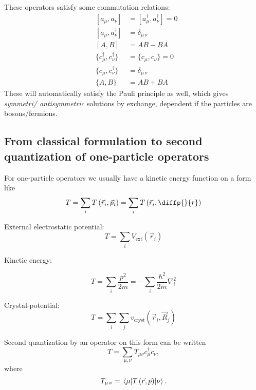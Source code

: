 These operators satisfy some commutation relations:
\begin{align}
&[a_\mu, a_{\nu}] & = [a_\mu^\dagger, a_{\nu}^\dagger] = 0 \\
&[a_\mu, a_{\nu}^\dagger] & = \delta_{\mu\,\nu} \\
&[A,B] &= AB-BA \\
&\{c_\mu^\dagger, c_{\nu}^\dagger\} & = \{c_\mu, c_{\nu}\} = 0 \\
&\{c_\mu, c_{\nu}^\dagger\} & = \delta_{\mu\,\nu} \\
&\{A,B\} &= AB + BA
\end{align}
These will automatically satisfy the Pauli principle as well, which gives \emph{symmetri/ \emph{antisymmetric}} solutions by exchange, dependent if the particles are bosons/fermions. 


\subsection{From classical formulation to second quantization of one-particle operators}

For one-particle operators we usually have a kinetic energy function on a form like
\begin{equation}
T = \sum_i T\left(\vec{r}_i, \vec{p}_i\right) = \sum_i T\left(\vec{r}_i, \diffp{}{r}\right)
\end{equation}
\begin{theorem}
External electrostatic potential:
\begin{equation}
T = \sum_i V_{\text{ext}}\left(\vec{r}_i\right)
\end{equation}
\end{theorem}
\begin{theorem}

Kinetic energy:

\begin{equation}
T = \sum_i \frac{p^2}{2m} = -\sum_i \frac{\hbar^2}{2m}\nabla_i^2
\end{equation}
\end{theorem}

\begin{theorem}
Crystal-potential:
\begin{equation}
T = \sum_i \sum_j v_{\text{cryst}} \left( \vec{r}_i, \vec{R}_j \right)
\end{equation}
\end{theorem}

Second quantization by an operator on this form can be written 
\begin{equation}
T = \sum_{\mu, \nu} T_{\mu\nu}c_\mu^\dagger c_{\nu},
\end{equation}
where
\begin{equation}
T_{\mu\,\nu} = \mel{\mu}{T\left(\vec{r}, \vec{p}\right)}{\nu}.	
\end{equation}


